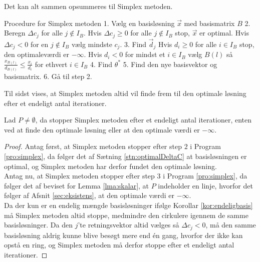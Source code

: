 Det kan alt sammen opsummeres til Simplex metoden.

\begin{pro}[label=pro:simplex,style=ingental]{Procedure for Simplex metoden}
1. Vælg en basisløsning $\vec{x}$ med basismatrix $B$
2. Beregn $\Delta c_j$ for alle $j \notin I_B$. 
   Hvis $\Delta c_j\geq 0$ for alle $j \notin I_B$ 
   	   stop, $\vec{x}$ er optimal.
   Hvis $\Delta c_j < 0$ for en $j \notin I_B$
       vælg mindste $c_j$.
3. Find $\vec{d}_j$
   Hvis $d_i \geq 0 $ for alle $i \in I_B$ 
       stop, den optimaleværdi er $- \infty$.
   Hvis $d_i < 0 $ for mindst et $i \in I_B$ 
       vælg $B(l)$ så $\frac{x_{B(l)}}{d_{B(l)}}\leq \frac{x_i}{d_i} $ for ethvert $i \in I_B$
4. Find $\theta^*$
5. Find den nye basisvektor og basismatrix.
6. Gå til step 2.
\end{pro}

Til sidst vises, at Simplex metoden altid vil finde frem til den optimale løsning efter et endeligt antal iterationer.

\begin{stn}
Lad $P \neq \emptyset$, da stopper Simplex metoden efter et endeligt antal iterationer, enten ved at finde den optimale løsning eller at den optimale værdi er $- \infty$.
\end{stn}

\begin{proof}
Antag først, at Simplex metoden stopper efter step $2$ i Program \ref{pro:simplex}, da følger det af Sætning \ref{stn:optimalDeltaC}
at basisløsningen er optimal, og Simplex metoden har derfor fundet den optimale løsning.\\ 
Antag nu, at Simplex metoden stopper efter step $3$ i Program \ref{pro:simplex}, da følger det af beviset for Lemma \ref{lma:skalar}, at $P$ indeholder en linje, hvorfor det følger af Afsnit \ref{sec:eksistens},
at den optimale værdi er $-\infty$.\\ 
Da der kun er en endelig mængde basisløsninger ifølge Korollar \ref{kor:endeligbasis} må Simplex metoden altid stoppe, medmindre den cirkulere igennem de samme basisløsninger.
Da den $j$'te retningsvektor altid vælges så $\Delta c_j < 0$, må den samme basisløsning aldrig kunne blive besøgt mere end én gang, hvorfor der ikke kan opstå en ring, og Simplex metoden må derfor stoppe efter et endeligt antal iterationer.
\end{proof} 